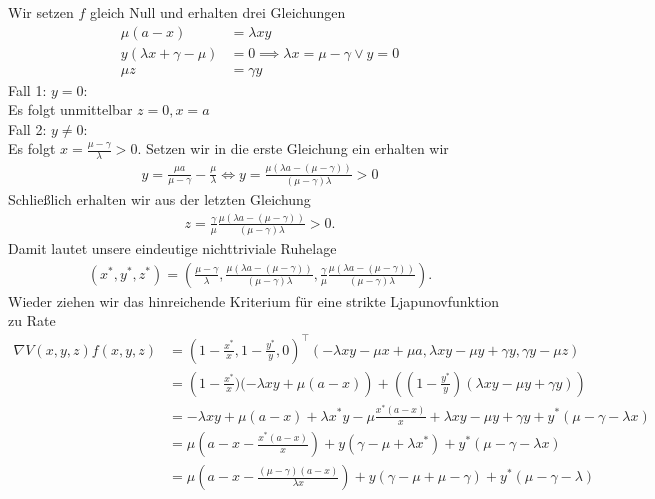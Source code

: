 \begin{solution}
Wir setzen $f$ gleich Null und erhalten drei Gleichungen
\begin{align}
  \mu (a-x) &= \lambda xy \\
  y(\lambda x + \gamma - \mu) &= 0 \implies \lambda x  = \mu - \gamma \lor y = 0\\
  \mu z &= \gamma y \label{3}
\end{align}
Fall 1: $y = 0$: \\
Es folgt unmittelbar $z = 0, x = a$ \\
Fall 2: $y \neq 0$: \\
Es folgt $x = \frac{\mu - \gamma}{\lambda} > 0$. Setzen wir in die erste Gleichung ein
erhalten wir
\begin{align*}
  y = \frac{\mu a}{\mu - \gamma} - \frac{\mu}{\lambda}
  \iff y = \frac{\mu(\lambda a - (\mu - \gamma))}{(\mu - \gamma)\lambda} > 0
\end{align*}
Schließlich erhalten wir aus der letzten Gleichung
\begin{align*}
  z = \frac{\gamma}{\mu} \frac{\mu(\lambda a - (\mu - \gamma))}{(\mu - \gamma)\lambda} > 0.
\end{align*}
Damit lautet unsere eindeutige nichttriviale Ruhelage
\begin{align*}
  (x^*,y^*,z^*) = (\frac{\mu - \gamma}{\lambda},\frac{\mu(\lambda a - (\mu - \gamma))}{(\mu - \gamma)\lambda},
    \frac{\gamma}{\mu} \frac{\mu(\lambda a - (\mu - \gamma))}{(\mu - \gamma)\lambda}).
\end{align*}
Wieder ziehen wir das hinreichende Kriterium für eine strikte Ljapunovfunktion zu Rate
\begin{align*}
  \nabla V(x,y,z)f(x,y,z) &= \left(1 - \frac{x^*}{x}, 1 - \frac{y^*}{y}, 0\right)^{\top}
  \left(- \lambda xy - \mu x + \mu a,\lambda xy - \mu y + \gamma y, \gamma y - \mu z\right) \\
  &= \left(1 - \frac{x^*}{x})(- \lambda xy + \mu (a - x)\right) +
  \left(\left(1 - \frac{y^*}{y}\right)\left(\lambda xy - \mu y + \gamma y\right)\right) \\
  &= - \lambda xy + \mu (a - x) + \lambda x^*y - \mu \frac{x^*(a-x)}{x} + \lambda xy - \mu y + \gamma y
  + y^*(\mu - \gamma - \lambda x)  \\
  &= \mu \left(a - x - \frac{x^*(a-x)}{x}\right) + y(\gamma - \mu + \lambda x^*) + y^*(\mu - \gamma - \lambda x) \\
  &= \mu \left(a - x - \frac{(\mu - \gamma)(a-x)}{\lambda x}\right) + y(\gamma - \mu + \mu - \gamma) +
  y^*(\mu - \gamma - \lambda) \\

\end{align*}
\end{solution}
